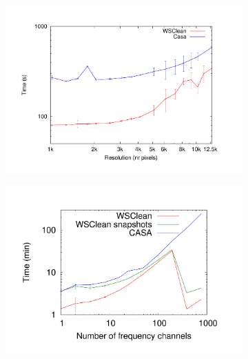 \documentclass[useAMS,usenatbib]{mn2e}
\begin{document}
\begin{figure}
\begin{subfigure}{.36\linewidth}
\caption{}\label{fig:timing-zenith-angle}%
\end{subfigure}\\
\begin{subfigure}{.36\linewidth}%
\includegraphics[width=\linewidth]{img/benchmark-resolution/resolution}
\caption{}\label{fig:timing-resolution}%
\end{subfigure}%
\hspace{-.05\linewidth}\begin{subfigure}{.36\linewidth}%
\includegraphics[width=\linewidth]{img/benchmark-channels/channels}
\caption{}\label{fig:timing-channels}%
\end{subfigure}%
\hspace{-.05\linewidth}\begin{subfigure}{.36\linewidth}%

\end{subfigure}
\end{figure}
\end{document}
